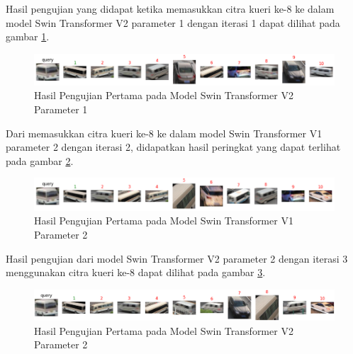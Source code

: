 Hasil pengujian yang didapat ketika memasukkan citra kueri ke-8 ke dalam model Swin Transformer V2 parameter 1 dengan 
iterasi 1 dapat dilihat pada gambar \ref{fig:hasilpengujianpertamapadamodelswintransformerv2param1}.

\begin{figure}[h!]
  \centering
  \includegraphics[scale=0.6]{gambar/Que8V2P1IT1.png}
  \caption{Hasil Pengujian Pertama pada Model Swin Transformer V2 Parameter 1}
  \label{fig:hasilpengujianpertamapadamodelswintransformerv2param1}
\end{figure}

Dari memasukkan citra kueri ke-8 ke dalam model Swin Transformer V1 parameter 2 dengan iterasi 2, didapatkan hasil 
peringkat yang dapat terlihat pada gambar \ref{fig:hasilpengujianpertamapadamodelswintransformerv1param2}.

\begin{figure}[h!]
  \centering
  \includegraphics[scale=0.6]{gambar/Que8V1P2IT2.png}
  \caption{Hasil Pengujian Pertama pada Model Swin Transformer V1 Parameter 2}
  \label{fig:hasilpengujianpertamapadamodelswintransformerv1param2}
\end{figure}

Hasil pengujian dari model Swin Transformer V2 parameter 2 dengan iterasi 3 menggunakan citra kueri ke-8 dapat 
dilihat pada gambar \ref{fig:hasilpengujianpertamapadamodelswintransformerv2param2}.

\begin{figure}[h!]
  \centering
  \includegraphics[scale=0.6]{gambar/Que8V2P2IT3.png}
  \caption{Hasil Pengujian Pertama pada Model Swin Transformer V2 Parameter 2}
  \label{fig:hasilpengujianpertamapadamodelswintransformerv2param2}
\end{figure}

